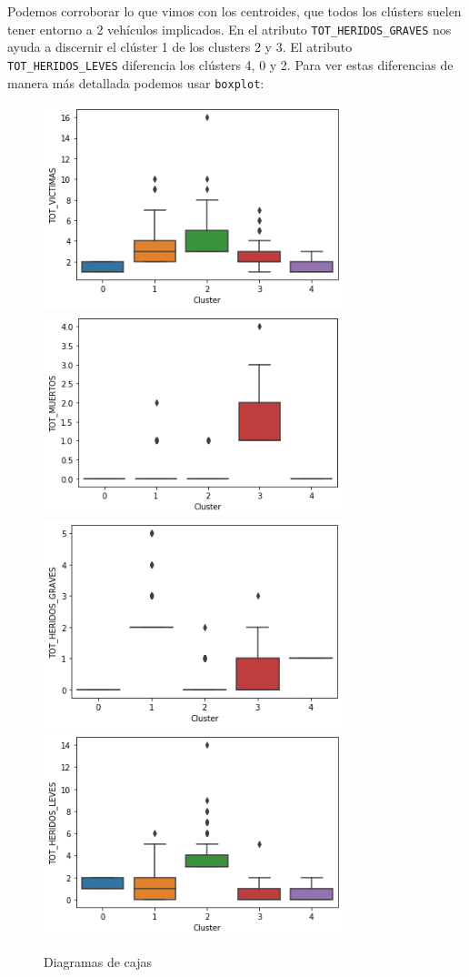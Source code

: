 \documentclass[a4]{article}
\begin{document}
Podemos corroborar lo que vimos con los centroides, que todos los clústers suelen tener entorno a 2 vehículos implicados. En el atributo \texttt{TOT\_HERIDOS\_GRAVES} nos ayuda a discernir el clúster 1 de los clusters 2 y 3. El atributo \texttt{TOT\_HERIDOS\_LEVES} diferencia los clústers 4, 0 y 2. Para ver estas diferencias de manera más detallada podemos usar \texttt{boxplot}:

\begin{figure}[H]
  \centering
  \caption{Diagramas de cajas}
  \includegraphics[width=87mm]{imagenes/c1_kmeans_bp_vic}
  \includegraphics[width=87mm]{imagenes/c1_kmeans_bp_muertos}
    \includegraphics[width=87mm]{imagenes/c1_kmeans_bp_hg}
  \includegraphics[width=87mm]{imagenes/c1_kmeans_bp_hl}

\end{figure}
\end{document}
